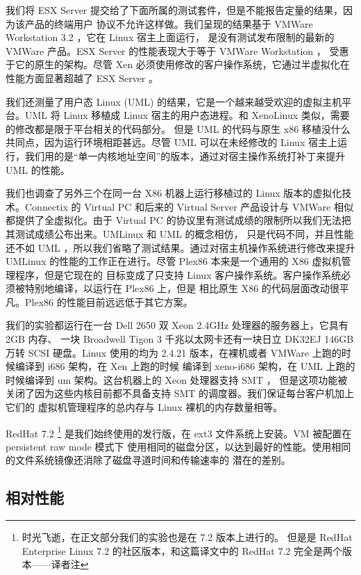 我们将 ESX Server 提交给了下面所属的测试套件，但是不能报告定量的结果，因为该产品的终端用户
协议不允许这样做。我们呈现的结果基于 VMWare Workstation 3.2 ，它在 Linux 宿主上面运行，
是没有测试发布限制的最新的 VMWare 产品。ESX Server 的性能表现大于等于 VMWare Workstation ，
受惠于它的原生的架构。尽管 Xen 必须使用修改的客户操作系统，它通过半虚拟化在性能方面显著超越了
ESX Server 。

我们还测量了用户态 Linux (UML) 的结果，它是一个越来越受欢迎的虚拟主机平台。UML 将 Linux
移植成 Linux 宿主的用户态进程。和 XenoLinux 类似，需要的修改都是限于平台相关的代码部分。
但是 UML 的代码与原生 x86 移植没什么共同点，因为运行环境相距甚远。尽管 UML 可以在未经修改的
Linux 宿主上运行，我们用的是“单一内核地址空间”的版本，通过对宿主操作系统打补丁来提升 UML 的性能。

我们也调查了另外三个在同一台 X86 机器上运行移植过的 Linux 版本的虚拟化技术。Connectix 的
Virtual PC 和后来的 Virtual Server 产品设计与 VMWare 相似都提供了全虚拟化。由于 Virtual
PC 的协议里有测试成绩的限制所以我们无法把其测试成绩公布出来。UMLinux 和 UML 的概念相仿，
只是代码不同，并且性能还不如 UML ，所以我们省略了测试结果。通过对宿主机操作系统进行修改来提升
UMLinux 的性能的工作正在进行。尽管 Plex86 本来是一个通用的 X86 虚拟机管理程序，但是它现在的
目标变成了只支持 Linux 客户操作系统。客户操作系统必须被特别地编译，以运行在 Plex86 上，但是
相比原生 X86 的代码层面改动很平凡。Plex86 的性能目前远远低于其它方案。

我们的实验都运行在一台 Dell 2650 双 Xeon 2.4GHz 处理器的服务器上，它具有 2GB 内存、
一块 Broadwell Tigon 3 千兆以太网卡还有一块日立 DK32EJ 146GB 万转 SCSI 硬盘。Linux
使用的均为 2.4.21 版本，在裸机或者 VMWare 上跑的时候编译到 i686 架构，在 Xen 上跑的时候
编译到 xeno-i686 架构，在 UML 上跑的时候编译到 um 架构。这台机器上的 Xeon 处理器支持 SMT ，
但是这项功能被关闭了因为这些内核目前都不具备支持 SMT 的调度器。我们保证每台客户机加上它们的
虚拟机管理程序的总内存与 Linux 裸机的内存数量相等。

RedHat 7.2 \footnote{时光飞逝，在正文部分我们的实验也是在 7.2 版本上进行的。
但是是 RedHat Enterprise Linux 7.2 的社区版本，和这篇译文中的 RedHat 7.2 完全是两个版本——译者注}
是我们始终使用的发行版，在 ext3 文件系统上安装。VM 被配置在 persistent raw mode 模式下
使用相同的磁盘分区，以达到最好的性能。使用相同的文件系统镜像还消除了磁盘寻道时间和传输速率的
潜在的差别。

\subsection{相对性能}

